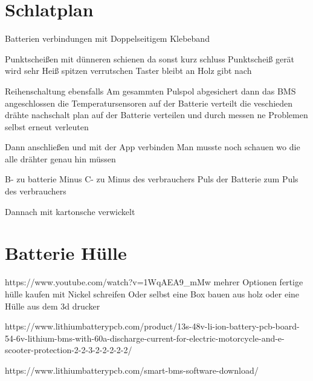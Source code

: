 \section{Schlatplan}
Batterien verbindungen mit Doppelseitigem Klebeband
 
Punktscheißen mit dünneren schienen da sonst kurz schluss
Punktscheiß gerät wird sehr Heiß 
spitzen verrutschen 
Taster bleibt an 
Holz gibt nach

Reihenschaltung ebensfalls 
Am gesammten Pulspol abgesichert 
dann das BMS angeschlossen die Temperatursensoren auf der Batterie verteilt
die veschieden drähte nachschalt plan auf der Batterie verteilen und durch messen 
ne Problemen selbst erneut verleuten

Dann anschließen und mit der App verbinden
Man musste noch schauen wo die alle drähter genau hin müssen

B- zu batterie Minus
C- zu Minus des verbrauchers
Puls der Batterie zum Puls des verbrauchers

Dannach mit kartonsche verwickelt
\section{Batterie Hülle}
https://www.youtube.com/watch?v=1WqAEA9_mMw
mehrer Optionen fertige hülle kaufen mit Nickel schreifen 
Oder selbst eine Box bauen aus holz oder 
eine Hülle aus dem 3d drucker



https://www.lithiumbatterypcb.com/product/13s-48v-li-ion-battery-pcb-board-54-6v-lithium-bms-with-60a-discharge-current-for-electric-motorcycle-and-e-scooter-protection-2-2-3-2-2-2-2-2/


https://www.lithiumbatterypcb.com/smart-bms-software-download/


